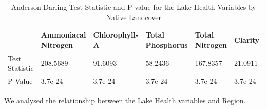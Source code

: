 \documentclass[
]{article}
\begin{document}
\begin{table}

\caption{\label{tab:adhelth}Anderson-Darling Test Statistic and P-value for the Lake Health Variables by Native Landcover}
\centering
\begin{tabular}[t]{l|l|l|l|l|l}
\hline
  & Ammoniacal Nitrogen & Chlorophyll-A & Total Phosphorus & Total Nitrogen & Clarity\\
\hline
Test Statistic & 208.5689 & 91.6093 & 58.2436 & 167.8357 & 21.0911\\
\hline
P-Value & 3.7e-24 & 3.7e-24 & 3.7e-24 & 3.7e-24 & 3.7e-24\\
\hline
\end{tabular}
\end{table}

We analysed the relationship between the Lake Health variables and Region.
\end{document}
